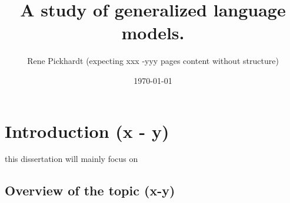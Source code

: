 \documentclass[•]{book}
\title{A study of generalized language models.}
\author{Rene Pickhardt (expecting xxx -yyy pages content without structure)}
\date{\today}
\begin{document}
\maketitle
\tableofcontents



\newcommand{\todo}[1]{\textcolor{blue}{\textbf{TODO}: #1}}
\newcommand{\cexp}[1]{$\texttt{"#1"}$}
\makeatletter
\newcommand{\eqnum}{\refstepcounter{equation}\textup{\tagform@{\theequation}}}
\makeatother
\makeatletter
\newcommand{\eqlab}[1]{\refstepcounter{equation}\label{#1}\textup{\tagform@{\theequation}}}
\makeatother

\newtheorem{theorem}{Theorem}[chapter]
\newtheorem{lemma}{Lemma}[chapter]
\theoremstyle{remark}
\newtheorem{remark}{Remark}[chapter]
\theoremstyle{definition}
\newtheorem{definition}{Definition}[chapter]
\theoremstyle{remark}
\newtheorem{example}{Example}[chapter]



\chapter{Introduction (x - y)}
this dissertation will mainly focus on \cite{own:typology:2013}
\section{Overview of the topic (x-y)}
\end{document}
